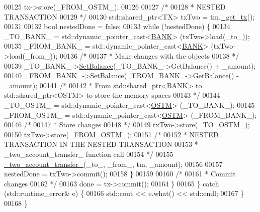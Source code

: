 \begin{DoxyCode}
00125             tx->store(\_FROM\_OSTM\_);
00126 
00127             \textcolor{comment}{/*}
00128 \textcolor{comment}{             * NESTED TRANSACTION}
00129 \textcolor{comment}{             */}
00130             std::shared\_ptr<TX> txTwo = tm.\hyperlink{class_t_m_a41cb0226cc4080c931651b13f74a0075_a41cb0226cc4080c931651b13f74a0075}{\_get\_tx}();
00131 
00132             \textcolor{keywordtype}{bool} nestedDone = \textcolor{keyword}{false};
00133             \textcolor{keywordflow}{while} (!nestedDone) \{
00134                 \_TO\_BANK\_ = std::dynamic\_pointer\_cast<\hyperlink{class_b_a_n_k}{BANK}> (txTwo->load(\_to\_));
00135                 \_FROM\_BANK\_ = std::dynamic\_pointer\_cast<\hyperlink{class_b_a_n_k}{BANK}> (txTwo->load(\_from\_));
00136                 \textcolor{comment}{/*}
00137 \textcolor{comment}{                 * Make changes with the objects}
00138 \textcolor{comment}{                 */}
00139                 \_TO\_BANK\_->\hyperlink{class_b_a_n_k_ae3e45b407bf8ec7175662442ea24b7c0_ae3e45b407bf8ec7175662442ea24b7c0}{SetBalance}(\_TO\_BANK\_->GetBalance() + \_amount);
00140                 \_FROM\_BANK\_->SetBalance(\_FROM\_BANK\_->GetBalance() - \_amount);
00141                 \textcolor{comment}{/*}
00142 \textcolor{comment}{                 * From std::shared\_ptr<BANK> to std::shared\_ptr<OSTM> to store the memory spaces}
00143 \textcolor{comment}{                 */}
00144                 \_TO\_OSTM\_ = std::dynamic\_pointer\_cast<\hyperlink{class_o_s_t_m}{OSTM}> (\_TO\_BANK\_);
00145                 \_FROM\_OSTM\_ = std::dynamic\_pointer\_cast<\hyperlink{class_o_s_t_m}{OSTM}> (\_FROM\_BANK\_);
00146                 \textcolor{comment}{/*}
00147 \textcolor{comment}{                 * Store changes}
00148 \textcolor{comment}{                 */}
00149                 txTwo->store(\_TO\_OSTM\_);
00150                 txTwo->store(\_FROM\_OSTM\_);
00151                 \textcolor{comment}{/*}
00152 \textcolor{comment}{                 * NESTED TRANSACTION IN THE NESTED TRANSACTION}
00153 \textcolor{comment}{                 * \_two\_account\_transfer\_ function call}
00154 \textcolor{comment}{                 */}
00155                 \hyperlink{classclient_a71edd1265ba9ae03f71b5dbf54548696_a71edd1265ba9ae03f71b5dbf54548696}{\_two\_account\_transfer\_}(\_to\_, \_from\_, tm, \_amount);
00156 
00157                 nestedDone = txTwo->commit();
00158             \}
00159 
00160             \textcolor{comment}{/*}
00161 \textcolor{comment}{             * Commit changes}
00162 \textcolor{comment}{             */}
00163             done = tx->commit();
00164         \}
00165     \} \textcolor{keywordflow}{catch} (std::runtime\_error& e) \{
00166         std::cout << e.what() << std::endl;
00167     \}
00168 \}
\end{DoxyCode}


